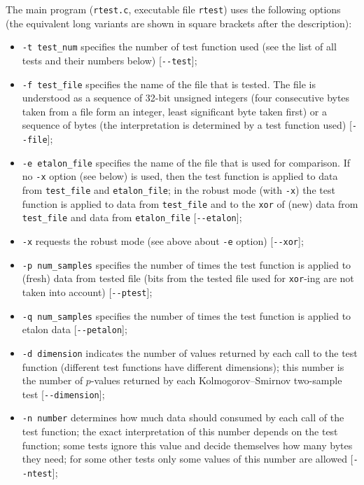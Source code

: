 \documentclass[12pt,a4paper,fullpage]{article}
\begin{document}
The main program (\texttt{rtest.c}, executable file \texttt{rtest}) uses the following options (the equivalent long variants are shown in square brackets after the description):
\begin{itemize}

\item \texttt{-t test\_num} specifies the number of test function used (see the list of all tests and their numbers below) [\texttt{{-}-test}];

\item \texttt{-f test\_file} specifies the name of the file that is tested. The file is understood as a sequence of 32-bit unsigned integers (four consecutive bytes taken from a file form an integer, least significant byte taken first) or a sequence of bytes (the interpretation is determined by a test function used) [\texttt{{-}-file}];

\item \texttt{-e etalon\_file} specifies the name of the file that is used for comparison. If no \texttt{-x} option (see below) is used, then the test function is applied to data from \texttt{test\_file} and \texttt{etalon\_file}; in the robust mode (with \texttt{-x}) the test function is applied to data from \texttt{test\_file} and to the \texttt{xor} of (new) data from \texttt{test\_file} and data from \texttt{etalon\_file} [\texttt{{-}-etalon}];

\item \texttt{-x} requests the robust mode (see above about \texttt{-e} option) [\texttt{{-}-xor}];

\item \texttt{-p num\_samples} specifies the number of times the test function is applied to (fresh) data from tested file (bits from the tested file used for \texttt{xor}-ing are not taken into account) [\texttt{{-}-ptest}];

\item \texttt{-q num\_samples} specifies the number of times the test function is applied to etalon data [\texttt{{-}-petalon}];

\item \texttt{-d dimension} indicates the number of values returned by each call to the test function (different test functions have different dimensions); this number is the number of $p$-values returned by each Kolmogorov--Smirnov two-sample test [\texttt{{-}-dimension}];

\item \texttt{-n number} determines how much data should consumed by each call of the test function; the exact interpretation of this number depends on the test function; some tests ignore this value and decide themselves how many bytes they need; for some other tests only some values of this number are allowed [\texttt{{-}-ntest}];


\end{itemize}
\end{document}
